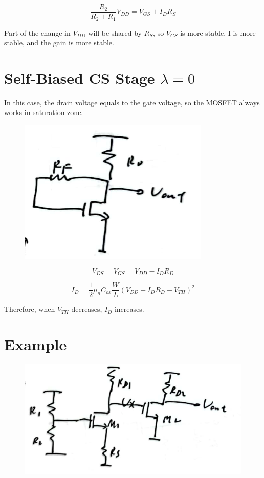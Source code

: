 \documentclass[fontset=windows]{article}
\begin{document}
$$\frac{R_2}{R_2+R_1}V_{DD}=V_{GS}+I_DR_S$$

Part of the change in $V_{DD}$ will be shared by $R_S$, so $V_{GS}$ is more stable, I is more stable, and the gain is more stable.

\section*{Self-Biased CS Stage $\lambda=0$}

In this case, the drain voltage equals to the gate voltage, so the MOSFET always works in saturation zone. 

\begin{figure}[htbp]
    \centering
    \includegraphics[scale=0.6]{8.jpg}
    \captionsetup{labelformat=empty}
    \caption{}
    \label{8}
\end{figure}

$$V_{DS}=V_{GS}=V_{DD}-I_DR_D$$

$$I_D=\frac{1}{2}\mu_nC_{ox}\frac{W}{L}(V_{DD}-I_DR_D-V_{TH})^2$$

Therefore, when $V_{TH}$ decreases, $I_D$ increases. 

\section*{Example}

\begin{figure}[htbp]
    \centering
    \includegraphics[scale=0.6]{9.jpg}
    \captionsetup{labelformat=empty}
    \caption{}
    \label{9}
\end{figure}
\end{document}
